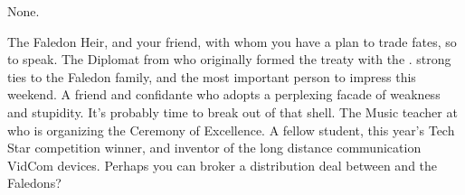 \documentclass[char]{GL2020}
\begin{document}
\begin{itemz}[Notes]
	\item None.
\end{itemz}

\begin{contacts}
	\contact{\cHeir{}} The Faledon Heir, and your friend, with whom you have a plan to trade fates, so to speak.
	\contact{\cDiplomat{}} The Diplomat from \pTech{} who originally formed the treaty with the \pFarm{}. \cDiplomat{\they} \cDiplomat{\have} strong ties to the Faledon family, and \cDiplomat{\theyare} the most important person to impress this weekend.
	\contact{\cChupStudent{}} A friend and confidante who adopts a perplexing facade of weakness and stupidity. It's probably time to break \cChupStudent{\them} out of that shell.
	\contact{\cMusic{}} The Music teacher at \pSchool{} who is organizing the Ceremony of Excellence.
	\contact{\cTechStar{}} A fellow student, this year's Tech Star competition winner, and inventor of the long distance communication VidCom devices. Perhaps you can broker a distribution deal between \cTechStar{\them} and the Faledons?
\end{contacts}
\end{document}
